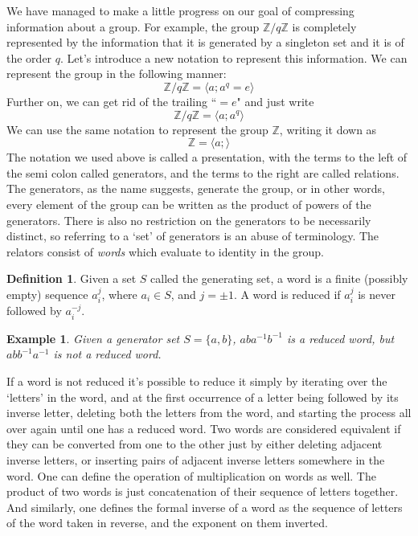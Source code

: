 \documentclass[12pt]{article}
\newtheorem{exmp}[thm]{Example}
\theoremstyle{definition}
\newtheorem{defn}{Definition}[section]
\begin{document}
We have managed to make a little progress on our goal of compressing information about a group. For example, the group $\mathbb{Z}/q\mathbb{Z}$ is completely represented by the information that it is generated by a singleton set and it is of the order $q$. Let's introduce a new notation to represent this information. We can represent the group in the following manner:
$$\mathbb{Z}/q\mathbb{Z} = \langle a;a^q=e \rangle$$
Further on, we can get rid of the trailing ``$=e$" and just write
$$\mathbb{Z}/q\mathbb{Z} = \langle a;a^q \rangle$$
We can use the same notation to represent the group $\mathbb{Z}$, writing it down as
$$\mathbb{Z} = \langle a;\rangle$$
The notation we used above is called a presentation, with the terms to the left of the semi colon called generators, and the terms to the right are called relations. The generators, as the name suggests, generate the group, or in other words, every element of the group can be written as the product of powers of the generators. There is also no restriction on the generators to be necessarily distinct, so referring to a `set' of generators is an abuse of terminology. The relators consist of \emph{words} which evaluate to identity in the group. 
\begin{defn}
Given a set $S$ called the generating set, a word is a finite (possibly empty) sequence $a_{i}^{j}$, where $a_i \in S$, and $j = \pm 1$. A word is reduced if $a_i^{j}$ is never followed by $a_i^{-j}$.
\end{defn}
\begin{exmp}
Given a generator set $S = \{a,b\}$, $aba^{-1}b^{-1}$ is a reduced word, but $abb^{-1}a^{-1}$ is not a reduced word.
\end{exmp}

If a word is not reduced it's possible to reduce it simply by iterating over the `letters' in the word, and at the first occurrence of a letter being followed by its inverse letter, deleting both the letters from the word, and starting the process all over again until one has a reduced word. Two words are considered equivalent if they can be converted from one to the other just by either deleting adjacent inverse letters, or inserting pairs of adjacent inverse letters somewhere in the word. One can define the operation of multiplication on words as well. The product of two words is just concatenation of their sequence of letters together. And similarly, one defines the formal inverse of a word as the sequence of letters of the word taken in reverse, and the exponent on them inverted.
\end{document}
